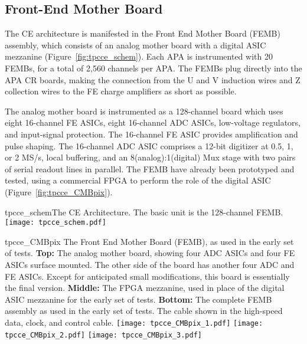 %
\subsection{Front-End Mother Board}
\label{subsec:fe_arch}

The CE architecture is manifested in the Front End Mother Board (FEMB) assembly,
which consists of an analog mother board with a digital ASIC mezzanine (Figure~\ref{fig:tpcce_schem}).
Each APA is instrumented with 20 FEMBs, for a total of 2,560 channels per APA.
The FEMBs plug directly into the APA CR boards, making the connection from the U and V induction wires and 
Z collection wires to the FE charge amplifiers as short as possible.

The analog mother board is instrumented as a 128-channel board which uses eight 16-channel FE ASICs,
eight 16-channel ADC ASICs, low-voltage regulators, and input-signal protection.
The 16-channel FE ASIC provides amplification and pulse shaping.
The 16-channel ADC ASIC comprises a 12-bit digitizer at 0.5, 1, or 2 MS/s, local buffering,
and an 8(analog):1(digital) Mux stage with two pairs of serial readout lines in parallel.
The FEMB have already been prototyped and tested,
using a commercial FPGA to perform the role of the digital ASIC (Figure~\ref{fig:tpcce_CMBpix}).

\begin{cdrfigure}{tpcce_schem}{The CE Architecture. The basic unit is the 128-channel FEMB.}
\texttt{[image: tpcce\_schem.pdf]}
\end{cdrfigure}

\begin{cdrfigure}{tpcce_CMBpix}
{The Front End Mother Board (FEMB), as used in the early set of tests.
  {\bf Top:} The analog mother board, showing four ADC ASICs and four FE ASICs surface mounted.
  The other side of the board has another four ADC and FE ASICs.
  Except for anticipated small modifications, this board is essentially the final version.
  {\bf Middle:} The FPGA mezzanine, used in place of the digital ASIC mezzanine for the early set of tests.
  {\bf Bottom:} The complete FEMB assembly as used in the early set of tests.
  The cable shown in the high-speed data, clock, and control cable.}
\texttt{[image: tpcce\_CMBpix\_1.pdf]}
\texttt{[image: tpcce\_CMBpix\_2.pdf]}
\texttt{[image: tpcce\_CMBpix\_3.pdf]}
\end{cdrfigure}


